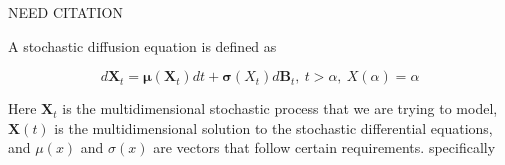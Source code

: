 NEED CITATION

A stochastic diffusion equation is defined as

\begin{equation}
    d{\textbf{X}}_t = {\pmb{\mu}} ({\textbf{X}}_t )dt + \pmb{\sigma}({X}_t ) d\textbf{B}_t, \   t > \alpha , \ \textbf{}{X}(\alpha) = {\alpha}
\end{equation}

Here $\textbf{X}_t$ is the multidimensional stochastic process that we are trying to model, $\textbf{X}(t)$ is the multidimensional solution to the stochastic differential equations, and $\mu(x)$ and $\sigma(x)$ are vectors that follow certain requirements. specifically 


